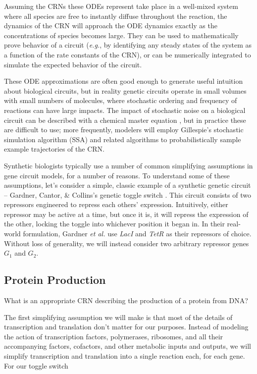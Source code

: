 \documentclass[preprint,12pt]{elsarticle}
\begin{document}
Assuming the CRNs these ODEs represent take place in a well-mixed system where all species are free to instantly diffuse throughout the reaction, the dynamics of the CRN will approach the ODE dynamics exactly as the concentrations of species becomes large. They can be used to mathematically prove behavior of a circuit (\emph{e.g.}, by identifying any steady states of the system as a function of the rate constants of the CRN), or can be numerically integrated to simulate the expected behavior of the circuit. 

These ODE approximations are often good enough to generate useful intuition about biological circuits, but in reality genetic circuits operate in small volumes with small numbers of molecules, where stochastic ordering and frequency of reactions can have large impacts. The impact of stochastic noise on a biological circuit can be described with a chemical master equation \cite{McQuarrie1967,Gillespie1992}, but in practice these are difficult to use; more frequently, modelers will employ Gillespie's stochastic simulation algorithm (SSA) \cite{Gillespie1977} and related algorithms to probabilistically sample example trajectories of the CRN. 

Synthetic biologists typically use a number of common simplifying assumptions in gene circuit models, for a number of reasons. To understand some of these assumptions, let's consider a simple, classic example of a synthetic genetic circuit -- Gardner, Cantor, \& Collins's genetic toggle switch \cite{Gardner2000}. This circuit consists of two repressors engineered to repress each others' expression. Intuitively, either repressor may be active at a time, but once it is, it will repress the expression of the other, locking the toggle into whichever position it began in. In their real-world formulation, Gardner \emph{et al.} use \emph{LacI} and \emph{TetR} as their repressors of choice. Without loss of generality, we will instead consider two arbitrary repressor genes $G_1$ and $G_2$. 

\subsection{Protein Production}

What is an appropriate CRN describing the production of a protein from DNA? 

The first simplifying assumption we will make is that most of the details of transcription and translation don't matter for our purposes. Instead of modeling the action of transcription factors, polymerases, ribosomes, and all their accompanying factors, cofactors, and other metabolic inputs and outputs, we will simplify transcription and translation into a single reaction each, for each gene. For our toggle switch
\end{document}
